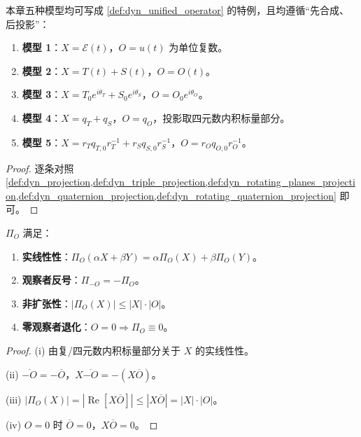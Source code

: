 \begin{theorem}[五种模型的统一表述]\label{thm:dyn_unified_representation}
本章五种模型均可写成 \cref{def:dyn_unified_operator} 的特例，且均遵循“先合成、后投影”：
\begin{enumerate}[label=(\roman*)]
    \item \textbf{模型 1}：$X=\mathcal E(t)$，$O=u(t)$ 为单位复数。
    \item \textbf{模型 2}：$X=T(t)+S(t)$，$O=O(t)$。
    \item \textbf{模型 3}：$X=T_0e^{i\theta_T}+S_0e^{i\theta_S}$，$O=O_0e^{i\theta_O}$。
    \item \textbf{模型 4}：$X=q_T+q_S$，$O=q_O$，投影取四元数内积标量部分。
    \item \textbf{模型 5}：$X=r_Tq_{T,0}r_T^{-1}+r_Sq_{S,0}r_S^{-1}$，$O=r_Oq_{O,0}r_O^{-1}$。
\end{enumerate}
\end{theorem}

\begin{proof}
逐条对照 \cref{def:dyn_projection,def:dyn_triple_projection,def:dyn_rotating_planes_projection,def:dyn_quaternion_projection,def:dyn_rotating_quaternion_projection} 即可。
\end{proof}

\begin{corollary}[投影算子的公理]\label{cor:dyn_projection_axioms}
$\Pi_O$ 满足：
\begin{enumerate}[label=(\roman*)]
    \item \textbf{实线性性}：$\Pi_O(\alpha X+\beta Y)=\alpha\Pi_O(X)+\beta\Pi_O(Y)$。
    \item \textbf{观察者反号}：$\Pi_{-O}=-\Pi_O$。
    \item \textbf{非扩张性}：$|\Pi_O(X)|\le|X|\cdot|O|$。
    \item \textbf{零观察者退化}：$O=0\Rightarrow\Pi_O\equiv 0$。
\end{enumerate}
\end{corollary}

\begin{proof}
(i) 由复/四元数内积标量部分关于 $X$ 的实线性性。

(ii) $\overline{-O}=-\overline O$，$X\overline{-O}=-(X\overline O)$。

(iii) $|\Pi_O(X)|=|\operatorname{Re}[X\overline O]|\le|X\overline O|=|X|\cdot|O|$。

(iv) $O=0$ 时 $\overline O=0$，$X\overline O=0$。
\end{proof}


